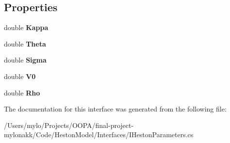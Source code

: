 \subsection*{Properties}
\begin{DoxyCompactItemize}
\item 
\mbox{\label{interface_heston_model_1_1_interfaces_1_1_i_variance_process_parameters_af2a9be20f736964e1fd77a50e4d0b53d}} 
double {\bfseries Kappa}
\item 
\mbox{\label{interface_heston_model_1_1_interfaces_1_1_i_variance_process_parameters_ab898d1c9956332c27b6823dd4b01480e}} 
double {\bfseries Theta}
\item 
\mbox{\label{interface_heston_model_1_1_interfaces_1_1_i_variance_process_parameters_a8738a03b23f87bc04b84ef49956c0ccf}} 
double {\bfseries Sigma}
\item 
\mbox{\label{interface_heston_model_1_1_interfaces_1_1_i_variance_process_parameters_a0681991d3df9962bb45930bc182d2fdd}} 
double {\bfseries V0}
\item 
\mbox{\label{interface_heston_model_1_1_interfaces_1_1_i_variance_process_parameters_ad456bc6e0d37133c10c8e5b8a2608f3a}} 
double {\bfseries Rho}
\end{DoxyCompactItemize}


The documentation for this interface was generated from the following file\+:\begin{DoxyCompactItemize}
\item 
/\+Users/mylo/\+Projects/\+O\+O\+P\+A/final-\/project-\/mylonakk/\+Code/\+Heston\+Model/\+Interfaces/I\+Heston\+Parameters.\+cs\end{DoxyCompactItemize}
